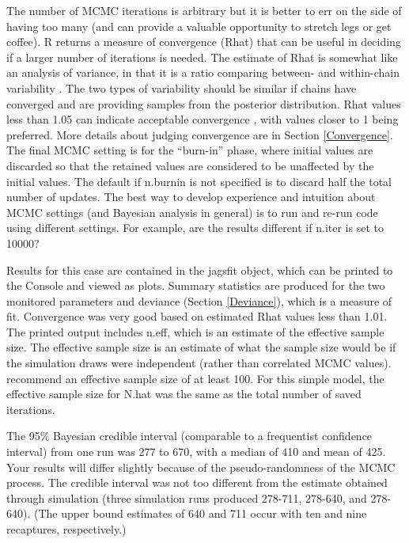 \documentclass[
]{krantz}
\begin{document}
The number of MCMC iterations is arbitrary but it is better to err on the side of having too many (and can provide a valuable opportunity to stretch legs or get coffee). R returns a measure of convergence (Rhat) that can be useful in deciding if a larger number of iterations is needed. The estimate of Rhat is somewhat like an analysis of variance, in that it is a ratio comparing between- and within-chain variability \citep{kéry.schaub_2011}. The two types of variability should be similar if chains have converged and are providing samples from the posterior distribution. Rhat values less than 1.05 can indicate acceptable convergence \citep{lunn.etal2012}, with values closer to 1 being preferred. More details about judging convergence are in Section \ref{Convergence}. The final MCMC setting is for the ``burn-in'' phase, where initial values are discarded so that the retained values are considered to be unaffected by the initial values. The default if n.burnin is not specified is to discard half the total number of updates. The best way to develop experience and intuition about MCMC settings (and Bayesian analysis in general) is to run and re-run code using different settings. For example, are the results different if n.iter is set to 10000?

Results for this case are contained in the jagsfit object, which can be printed to the Console and viewed as plots. Summary statistics are produced for the two monitored parameters and deviance (Section \ref{Deviance}), which is a measure of fit. Convergence was very good based on estimated Rhat values less than 1.01. The printed output includes n.eff, which is an estimate of the effective sample size. The effective sample size is an estimate of what the sample size would be if the simulation draws were independent (rather than correlated MCMC values). \citet{gelman.hill_2006} recommend an effective sample size of at least 100. For this simple model, the effective sample size for N.hat was the same as the total number of saved iterations.

The 95\% Bayesian credible interval (comparable to a frequentist confidence interval) from one run was 277 to 670, with a median of 410 and mean of 425. Your results will differ slightly because of the pseudo-randomness of the MCMC process. The credible interval was not too different from the estimate obtained through simulation (three simulation runs produced 278-711, 278-640, and 278-640). (The upper bound estimates of 640 and 711 occur with ten and nine recaptures, respectively.)
\end{document}

